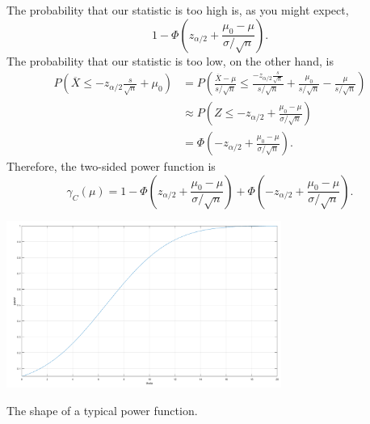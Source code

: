 \documentclass[12pt]{article}
\newcommand{\xbar}{\overline{X}}
\theoremstyle{definition}
\begin{document}
The probability that our statistic is too high is, as you might expect,
	\[1 - \Phi\left(  z_{\alpha/2}+\frac{\mu_0 - \mu}{\sigma / \sqrt{n}}\right).	\]
The probability that our statistic is too low, on the other hand, is 
\begin{align*}
	P\left( \xbar   \leq -z_{\alpha/2}\frac{s}{\sqrt{n}}+\mu_0 \right) 
		& =	P\left( \frac{\xbar -\mu}{s / \sqrt{n}}  \leq \frac{-z_{\alpha/2}\frac{s}{\sqrt{n}}}{s / \sqrt{n}}+\frac{\mu_0}{s / \sqrt{n}} - \frac{\mu}{s / \sqrt{n}} \right) \\
		&\approx 	P\left( Z  \leq -z_{\alpha/2}+\frac{\mu_0 - \mu}{\sigma / \sqrt{n}} \right) \\
		& = \Phi \left(-z_{\alpha/2}+\frac{\mu_0 - \mu}{\sigma / \sqrt{n}} \right).
\end{align*}
Therefore, the two-sided power function is
	\[	\gamma_C(\mu) = 1 - \Phi\left(  z_{\alpha/2}+\frac{\mu_0 - \mu}{\sigma / \sqrt{n}}\right) + \Phi \left(-z_{\alpha/2}+\frac{\mu_0 - \mu}{\sigma / \sqrt{n}} \right).\]		
	\begin{center}
			\includegraphics[width=340px]{p2c.png}
			
			\footnotesize The shape of a typical power function.
	\end{center} 
		
\end{document}
